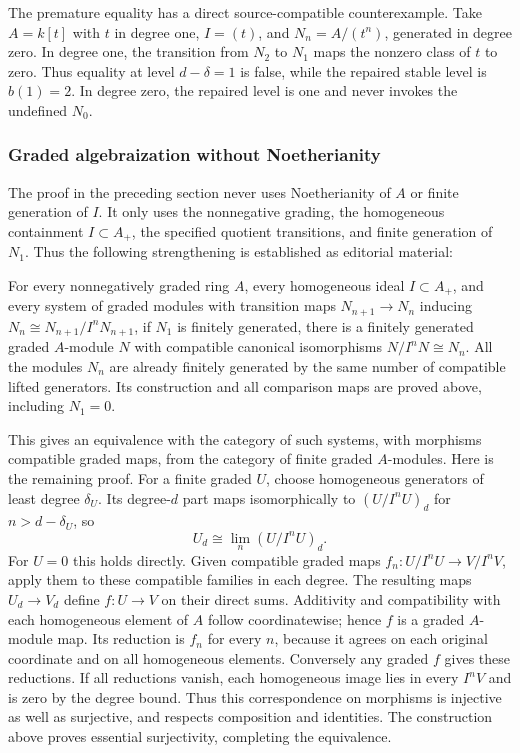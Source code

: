 The premature equality has a direct source-compatible counterexample. Take \(A=k[t]\) with \(t\) in degree one, \(I=(t)\), and \(N_n=A/(t^n)\), generated in degree zero. In degree one, the transition from \(N_2\) to \(N_1\) maps the nonzero class of \(t\) to zero. Thus equality at level \(d-\delta=1\) is false, while the repaired stable level is \(b(1)=2\). In degree zero, the repaired level is one and never invokes the undefined \(N_0\).

\subsubsection{Graded algebraization without Noetherianity}\label{graded-algebraization-without-noetherianity}

The proof in the preceding section never uses Noetherianity of \(A\) or finite generation of \(I\). It only uses the nonnegative grading, the homogeneous containment \(I\subset A_+\), the specified quotient transitions, and finite generation of \(N_1\). Thus the following strengthening is established as editorial material:

For every nonnegatively graded ring \(A\), every homogeneous ideal \(I\subset A_+\), and every system of graded modules with transition maps \(N_{n+1}\to N_n\) inducing \(N_n\cong N_{n+1}/I^nN_{n+1}\), if \(N_1\) is finitely generated, there is a finitely generated graded \(A\)-module \(N\) with compatible canonical isomorphisms \(N/I^nN\cong N_n\). All the modules \(N_n\) are already finitely generated by the same number of compatible lifted generators. Its construction and all comparison maps are proved above, including \(N_1=0\).

This gives an equivalence with the category of such systems, with morphisms compatible graded maps, from the category of finite graded \(A\)-modules. Here is the remaining proof. For a finite graded \(U\), choose homogeneous generators of least degree \(\delta_U\). Its degree-\(d\) part maps isomorphically to \((U/I^nU)_d\) for \(n>d-\delta_U\), so \[
U_d\cong\lim_n(U/I^nU)_d .
\] For \(U=0\) this holds directly. Given compatible graded maps \(f_n:U/I^nU\to V/I^nV\), apply them to these compatible families in each degree. The resulting maps \(U_d\to V_d\) define \(f:U\to V\) on their direct sums. Additivity and compatibility with each homogeneous element of \(A\) follow coordinatewise; hence \(f\) is a graded \(A\)-module map. Its reduction is \(f_n\) for every \(n\), because it agrees on each original coordinate and on all homogeneous elements. Conversely any graded \(f\) gives these reductions. If all reductions vanish, each homogeneous image lies in every \(I^nV\) and is zero by the degree bound. Thus this correspondence on morphisms is injective as well as surjective, and respects composition and identities. The construction above proves essential surjectivity, completing the equivalence.

